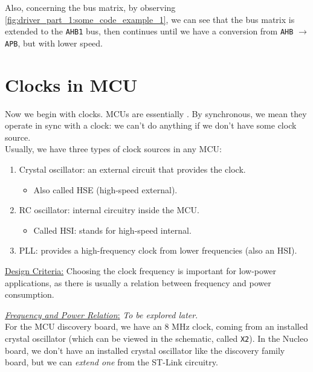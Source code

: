 Also, concerning the bus matrix, by observing \autoref{fig:driver_part_1:some_code_example_1}, we can see that the bus matrix is extended to the \verb|AHB1| bus, then continues until we have a conversion from \verb|AHB| $\rightarrow$ \verb|APB|, but with lower speed. 

\newpage
\section{Clocks in MCU}

Now we begin with clocks. MCUs are essentially . By synchronous, we mean they operate in sync with a clock: we can't do anything if we don't have some clock source.\\

Usually, we have three types of clock sources in any MCU:

\begin{enumerate}
    \item Crystal oscillator: an external circuit that provides the clock.

    \begin{itemize}
        \item Also called HSE (high-speed external).
    \end{itemize}

    \item RC oscillator: internal circuitry inside the MCU.

    \begin{itemize}
        \item Called HSI: stands for high-speed internal.
    \end{itemize}

    \item PLL: provides a high-frequency clock from lower frequencies (also an HSI).
\end{enumerate}


\underline{Design Criteria:} Choosing the clock frequency is important for low-power applications, as there is usually a relation between frequency and power consumption.

 \underline{\textit{Frequency and Power Relation}:} \textit{To be explored later}.\\

For the MCU discovery board, we have an 8 MHz clock, coming from an installed crystal oscillator (which can be viewed in the schematic, called \verb|X2|). In the Nucleo board, we don't have an installed crystal oscillator like the discovery family board, but we can \textit{extend one} from the ST-Link circuitry.


